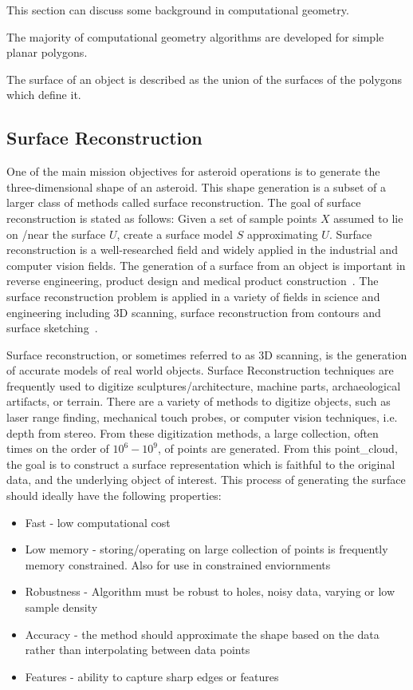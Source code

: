 This section can discuss some background in computational geometry.

The majority of computational geometry algorithms are developed for simple planar \glspl{polygon}.

The surface of an object is described as the union of the surfaces of the polygons which define it.


\subsection{Surface Reconstruction}
One of the main mission objectives for asteroid operations is to generate the three-dimensional shape of an asteroid.
This shape generation is a subset of a larger class of methods called surface reconstruction.
The goal of surface reconstruction is stated as follows: Given a set of sample points \( X\) assumed to lie on /near the surface \( U \), create a surface model \( S \) approximating \( U \).
Surface reconstruction is a well-researched field and widely applied in the industrial and computer vision fields.
The generation of a surface from an object is important in reverse engineering, product design and medical product construction~\cite{amenta2001}.
The surface reconstruction problem is applied in a variety of fields in science and engineering including 3D scanning, surface reconstruction from contours and surface sketching~\cite{hoppe1992}.

Surface reconstruction, or sometimes referred to as 3D scanning, is the generation of accurate models of real world objects.
Surface Reconstruction techniques are frequently used to digitize sculptures/architecture, machine parts, archaeological artifacts, or terrain.
There are a variety of methods to digitize objects, such as laser range finding, mechanical touch probes, or computer vision techniques, i.e. depth from stereo.
From these digitization methods, a large collection, often times on the order of \( 10^6 - 10^9\), of points are generated.
From this \gls{point_cloud}, the goal is to construct a surface representation which is faithful to the original data, and the underlying object of interest.
This process of generating the surface should ideally have the following properties:
\begin{itemize}
    \item Fast - low computational cost
    \item Low memory - storing/operating on large collection of points is frequently memory constrained. Also for use in constrained enviornments
    \item Robustness - Algorithm must be robust to holes, noisy data, varying or low sample density
    \item Accuracy - the method should approximate the shape based on the data rather than interpolating between data points
    \item Features - ability to capture sharp edges or features
\end{itemize}

